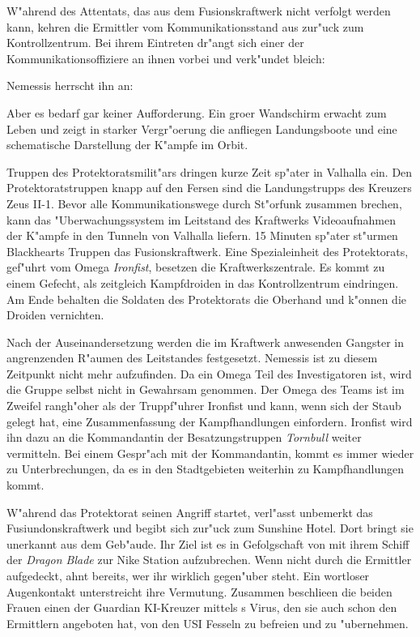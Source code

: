 
W"ahrend des Attentats, das aus dem Fusionskraftwerk nicht verfolgt werden kann, kehren die Ermittler vom Kommunikationsstand aus zur"uck zum Kontrollzentrum. Bei ihrem Eintreten dr"angt sich einer der Kommunikationsoffiziere an ihnen vorbei und verk"undet bleich:

 Nemessis herrscht ihn an: 

Aber es bedarf gar keiner Aufforderung. Ein gro\3er Wandschirm erwacht zum Leben und zeigt in starker Vergr"o\3erung die anfliegen Landungsboote und eine schematische Darstellung der K"ampfe im Orbit.

Truppen des Protektoratsmilit"ars dringen kurze Zeit sp"ater in Valhalla ein. Den Protektoratstruppen knapp auf den Fersen sind die Landungstrupps des Kreuzers Zeus II-1. Bevor alle Kommunikationswege durch St"orfunk zusammen brechen, kann das "Uberwachungssystem im Leitstand des Kraftwerks Videoaufnahmen der K"ampfe in den Tunneln von Valhalla liefern. 15 Minuten sp"ater st"urmen Blackhearts Truppen das Fusionskraftwerk. Eine Spezialeinheit des Protektorats, gef"uhrt vom Omega \emph{Ironfist}, besetzen die Kraftwerkszentrale. Es kommt zu einem Gefecht, als zeitgleich Kampfdroiden in das Kontrollzentrum eindringen. Am Ende behalten die Soldaten des Protektorats die Oberhand und k"onnen die Droiden vernichten. 

Nach der Auseinandersetzung werden die im Kraftwerk anwesenden Gangster in angrenzenden R"aumen des Leitstandes festgesetzt. Nemessis ist zu diesem Zeitpunkt nicht mehr aufzufinden. Da ein Omega Teil des Investigatoren ist, wird die Gruppe selbst nicht in Gewahrsam genommen. Der Omega des Teams ist im Zweifel rangh"oher als der Truppf"uhrer Ironfist und kann, wenn sich der Staub gelegt hat, eine Zusammenfassung der Kampfhandlungen einfordern. Ironfist wird ihn dazu an die Kommandantin der Besatzungstruppen \emph{Tornbull} weiter vermitteln. Bei einem Gespr"ach mit der Kommandantin, kommt es immer wieder zu Unterbrechungen, da es in den Stadtgebieten weiterhin zu Kampfhandlungen kommt.

W"ahrend das Protektorat seinen Angriff startet, verl"asst \xl{} unbemerkt das Fusiundonskraftwerk und begibt sich zur"uck zum Sunshine Hotel. Dort bringt sie \ml{} unerkannt aus dem Geb"aude. Ihr Ziel ist es in Gefolgschaft von \ml{} mit ihrem Schiff der \emph{Dragon Blade} zur Nike Station aufzubrechen. Wenn nicht durch die Ermittler aufgedeckt, ahnt \ml{} bereits, wer ihr wirklich gegen"uber steht. Ein wortloser Augenkontakt unterstreicht ihre Vermutung. Zusammen beschlie\3en die beiden Frauen einen der Guardian KI-Kreuzer mittels \ml{}s Virus, den sie auch schon den Ermittlern angeboten hat, von den USI Fesseln zu befreien und zu "ubernehmen. 


